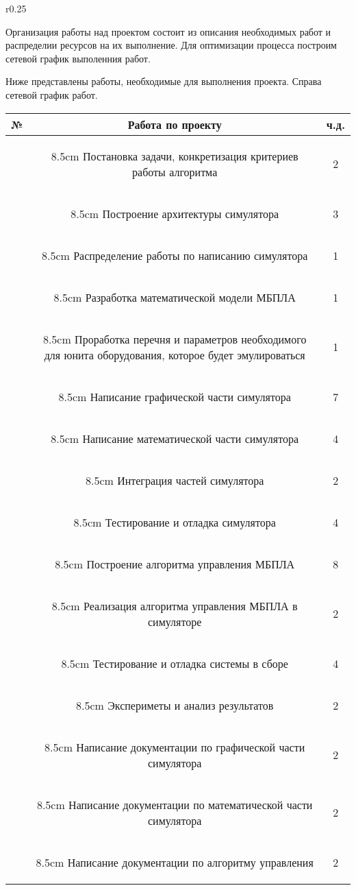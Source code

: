 {\begin{wrapfigure}{r}{0.25\linewidth}
\begin{flushright}
\end{flushright}
\end{wrapfigure}

Организация работы над проектом состоит из описания необходимых работ
и распределии ресурсов на их выполнение. Для оптимизации процесса
построим сетевой график выполенния работ.

Ниже представлены работы, необходимые для выполнения проекта.
Справа сетевой график работ.

\vspace{1em}

\def\taskNo{\addtocounter{taskNoCounter}{1}\arabic{taskNoCounter}}

\newcommand{\ttelem}[2]%
{
    \hline
    \taskNo & \begin{tabpage}{8.5cm}
    #1
    \end{tabpage} &#2 \\
}

\begin{flushleft}
\begin{tabular}{|c|c|c|}

\hline
№ & Работа по проекту & ч.д. \\

\ttelem{Постановка задачи, конкретизация критериев работы алгоритма}{2}

\ttelem{Построение архитектуры симулятора}{3}

\ttelem{Распределение работы по написанию симулятора}{1}

\ttelem{Разработка математической модели МБПЛА}{1}

\ttelem{Проработка перечня и параметров необходимого
для юнита оборудования, которое будет эмулироваться}{1}

\ttelem{Написание графической части симулятора}{7}

\ttelem{Написание математической части симулятора}{4}

\ttelem{Интеграция частей симулятора}{2}

\ttelem{Тестирование и отладка симулятора}{4}

\ttelem{Построение алгоритма управления \lb МБПЛА}{8}

\ttelem{Реализация алгоритма управления МБПЛА в симуляторе}{2}

\ttelem{Тестирование и отладка системы в сборе}{4}

\ttelem{Экспериметы и анализ результатов}{2}

\ttelem{Написание документации по графической части симулятора}{2}

\ttelem{Написание документации по математической части симулятора}{2}

\ttelem{Написание документации по алгоритму управления}{2}

\hline
\end{tabular}
\end{flushleft}
}

